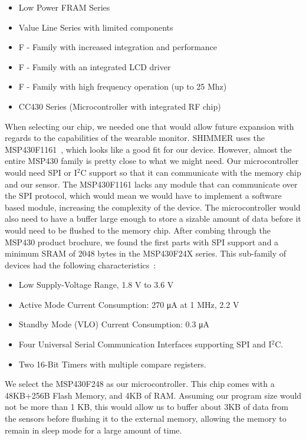 \begin{itemize}
  \item Low Power FRAM Series
  \item Value Line Series with limited components
  \item F - Family with increased integration and performance
  \item F - Family with an integrated LCD driver
  \item F - Family with high frequency operation (up to 25 Mhz)
  \item CC430 Series (Microcontroller with integrated RF chip)
\end{itemize}

When selecting our chip,
we needed one that would allow future expansion with regards to the capabilities of the wearable monitor.
SHIMMER uses the MSP430F1161~\cite{Web:ShimmerHome},
which looks like a good fit for our device. 
However, almost the entire MSP430 family is pretty close to what we might need.
Our microcontroller would need SPI or I$^2$C support so that it can communicate with the memory chip and our sensor.
The MSP430F1161 lacks any module that can communicate over the SPI protocol,
which would mean we would have to implement a software based module,
increasing the complexity of the device.
The microcontroller would also need to have a buffer large enough to store
a sizable amount of data before it would need to be flushed to the memory chip.
After combing through the MSP430 product brochure, we found the first parts with SPI support and
a minimum SRAM of 2048 bytes in the MSP430F24X series. This sub-family of devices had
the following characteristics~\cite{msp430F24xfamily}:

\begin{itemize}
	\item Low Supply-Voltage Range, 1.8 V to 3.6 V
	\item Active Mode Current Consumption: 270 μA at 1 MHz, 2.2 V
	\item Standby Mode (VLO) Current Consumption: 0.3 μA
	\item Four Universal Serial Communication Interfaces supporting SPI and I$^2$C.
	\item Two 16-Bit Timers with multiple compare registers.
\end{itemize}
We select the MSP430F248 as our microcontroller. This chip comes with a 48KB+256B Flash Memory, and 4KB of RAM. Assuming our program size would not be more than 1 KB, this would allow us to buffer about 3KB of data from the sensors before flushing it to the external memory, allowing the memory to remain in sleep mode for a large amount of time.

